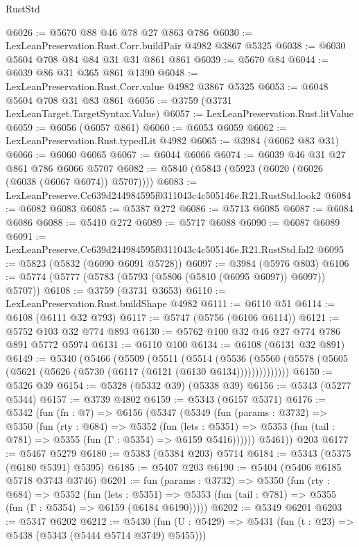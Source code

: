 \begin{lexlean}{RustStd}
\begin{coremodule}
@6026 := @5670 @88 @46 @78 @27 @863 @786
@6030 := LexLeanPreservation.Rust.Corr.buildPair @4982 @3867 @5325
@6038 := @6030 @5604 @708 @84 @84 @31 @31 @861 @861
@6039 := @5670 @84
@6044 := @6039 @86 @31 @365 @861 @1390
@6048 := LexLeanPreservation.Rust.Corr.value @4982 @3867 @5325
@6053 := @6048 @5604 @708 @31 @83 @861
@6056 := @3759 (@3731 LexLeanTarget.TargetSyntax.Value)
@6057 := LexLeanPreservation.Rust.litValue
@6059 := @6056 (@6057 @861)
@6060 := @6053 @6059
@6062 := LexLeanPreservation.Rust.typedLit @4982
@6065 := @3984 (@6062 @83 @31)
@6066 := @6060 @6065
@6067 := @6044 @6066
@6074 := @6039 @46 @31 @27 @861 @786 @6066 @5707
@6082 := @5840 (@5843 (@5923 (@6020 (@6026 (@6038 (@6067 @6074)) @5707))))
@6083 := LexLeanPreserve.Cc639d244984595f0311043c4c505146e.R21.RustStd.look2
@6084 := @6082 @6083
@6085 := @5387 @272
@6086 := @5713 @6085
@6087 := @6084 @6086
@6088 := @5410 @272
@6089 := @5717 @6088
@6090 := @6087 @6089
@6091 := LexLeanPreserve.Cc639d244984595f0311043c4c505146e.R21.RustStd.fal2
@6095 := @5823 (@5832 (@6090 @6091 @5728))
@6097 := @3984 (@5976 @803)
@6106 := @5774 (@5777 (@5783 (@5793 (@5806 (@5810 (@6095 @6097)) @6097)) @5707))
@6108 := @3759 (@3731 @3653)
@6110 := LexLeanPreservation.Rust.buildShape @4982
@6111 := @6110 @51
@6114 := @6108 (@6111 @32 @793)
@6117 := @5747 (@5756 (@6106 @6114))
@6121 := @5752 @103 @32 @774 @893
@6130 := @5762 @100 @32 @46 @27 @774 @786 @891 @5772 @5974
@6131 := @6110 @100
@6134 := @6108 (@6131 @32 @891)
@6149 := @5340
    (@5466
      (@5509
        (@5511
          (@5514
            (@5536
              (@5560 (@5578 (@5605 (@5621 (@5626 (@5730 (@6117 (@6121 (@6130 @6134))))))))))))))
@6150 := @5326 @39
@6154 := @5328 (@5332 @39) (@5338 @39)
@6156 := @5343 (@5277 @5344)
@6157 := @3739 @4802
@6159 := @5343 (@6157 @5371)
@6176 := @5342
    (fun (fn : @7) =>
    @6156
      (@5347
        (@5349
          (fun (params : @3732) =>
          @5350
            (fun (rty : @684) =>
            @5352
              (fun (lets : @5351) =>
              @5353 (fun (tail : @781) => @5355 (fun (Γ : @5354) => @6159 @5416))))))
        @5461))
    @203
@6177 := @5467 @5279
@6180 := @5383 (@5384 @203) @5714
@6184 := @5343 (@5375 (@6180 @5391) @5395)
@6185 := @5407 @203
@6190 := @5404 (@5406 @6185 @5718 @3743 @3746)
@6201 := fun (params : @3732) =>
  @5350
    (fun (rty : @684) =>
    @5352
      (fun (lets : @5351) =>
      @5353 (fun (tail : @781) => @5355 (fun (Γ : @5354) => @6159 (@6184 @6190)))))
@6202 := @5349 @6201
@6203 := @5347 @6202
@6212 := @5430 (fun (U : @5429) => @5431 (fun (t : @23) => @5438 (@5343 (@5444 @5714 @3749) @5455)))

\end{coremodule}
\end{lexlean}
